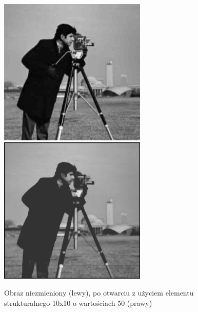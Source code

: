 \documentclass[a4paper,12pt]{book}
\begin{document}
\begin{figure}[H]
	\caption{Obraz niezmieniony (lewy), po otwarciu z użyciem elementu strukturalnego 10x10 o wartościach 50 (prawy)}
	\includegraphics[width=7cm, height=7cm]{man-unmodified.jpg}
	\includegraphics[width=7cm, height=7cm]{morph-gray-opening-strel10x10-50.png}
\end{figure}
\end{document}

